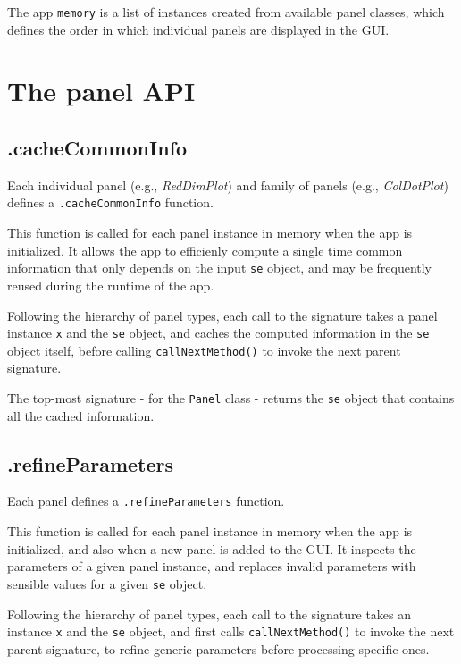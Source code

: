 \documentclass[]{book}
\begin{document}
The app \texttt{memory} is a list of instances created from available panel classes, which defines the order in which individual panels are displayed in the GUI.

\hypertarget{panel-api}{%
\section{The panel API}\label{panel-api}}

\hypertarget{cachecommoninfo}{%
\subsection{.cacheCommonInfo}\label{cachecommoninfo}}

Each individual panel (e.g., \emph{RedDimPlot}) and family of panels (e.g., \emph{ColDotPlot}) defines a \texttt{.cacheCommonInfo} function.

This function is called for each panel instance in memory when the app is initialized.
It allows the app to efficienly compute a single time common information that only depends on the input \texttt{se} object, and may be frequently reused during the runtime of the app.

Following the hierarchy of panel types, each call to the signature takes a panel instance \texttt{x} and the \texttt{se} object, and caches the computed information in the \texttt{se} object itself, before calling \texttt{callNextMethod()} to invoke the next parent signature.

The top-most signature - for the \texttt{Panel} class - returns the \texttt{se} object that contains all the cached information.

\hypertarget{refineparameters}{%
\subsection{.refineParameters}\label{refineparameters}}

Each panel defines a \texttt{.refineParameters} function.

This function is called for each panel instance in memory when the app is initialized, and also when a new panel is added to the GUI.
It inspects the parameters of a given panel instance, and replaces invalid parameters with sensible values for a given \texttt{se} object.

Following the hierarchy of panel types, each call to the signature takes an instance \texttt{x} and the \texttt{se} object, and first calls \texttt{callNextMethod()} to invoke the next parent signature, to refine generic parameters before processing specific ones.
\end{document}
